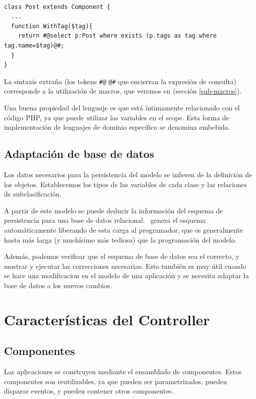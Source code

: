 \begin{verbatim}

class Post extends Component {
  ...
  function WithTag($tag){
    return #@select p:Post where exists (p.tags as tag where tag.name=$tag)@#;
  }
}

\end{verbatim}

La sintaxis extraña (los tokens \verb"#@" \verb"@#" que encierran la expresión de consulta) corresponde a la utilización de macros, que veremos en (sección \ref{sub-macros}).

Una buena propiedad del lenguaje es que está íntimamente relacionado con el código PHP, ya que puede utilizar las variables en el scope. Esta forma de implementación de lenguajes de dominio específico se denomina embebida.

\subsection{Adaptación de base de datos}
\label{sub-adapt}
Los datos necesarios para la persistencia del modelo se infieren de la definición de los objetos. Establecemos los tipos de las variables de cada clase y las relaciones de subclasificación.

A partir de este modelo se puede deducir la información del esquema de persistencia para una base de datos relacional. \PWB \ genera el esquema automáticamente liberando de esta carga al programador, que es generalmente hasta más larga (y muchísimo más tediosa) que la programación del modelo.

Además, podemos verificar que el esquema de base de datos sea el correcto, y mostrar y ejecutar las correcciones necesarias. Esto también es muy útil cuando se hace una modificacion en el modelo de una aplicación y se necesita adaptar la base de datos a los nuevos cambios.

\section{Características del Controller}
\label{sec-controller}
\subsection{Componentes}
\label{sub-comp}

Las aplicaciones se construyen mediante el ensamblado de componentes. Estos componentes son reutilizables, ya que pueden ser parametrizados, pueden disparar eventos, y pueden contener otros componentes.

